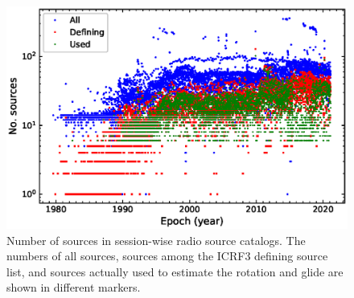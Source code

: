 \documentclass{aa}
\begin{document}
\begin{appendix}
 \begin{figure}[hbtp]
   \centering
   \includegraphics[width=\columnwidth]{figs/num_sou_in_sess}  %
   \caption[]{\label{fig:waterfalls} %
	Number of sources in session-wise radio source catalogs.
	The numbers of all sources, sources among the ICRF3 defining source list, and
	sources actually used to estimate the rotation and glide are shown in different markers.
   }
 \end{figure}




\end{appendix}
\end{document}
